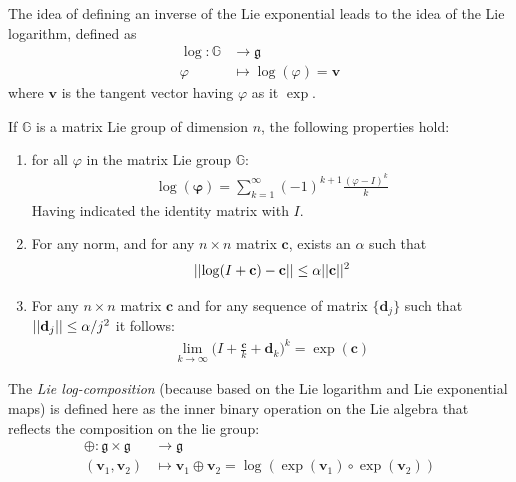 The idea of defining an inverse of the Lie exponential leads to the idea of the Lie logarithm, defined as
\begin{align*}
\log : \mathbb{G} & \longrightarrow \mathfrak{g} \\
\varphi &\longmapsto \log (\varphi)  =  \mathbf{v}   
\end{align*}
where $\mathbf{v}$ is the tangent vector having $\varphi$ as it $\exp$.

\noindent
If $\mathbb{G}$ is a matrix Lie group of dimension $n$, the following properties hold:
\begin{enumerate}
	\item for all $\varphi$ in the matrix Lie group $\mathbb{G}$:
	\begin{align}\label{eq:log_as_inf_sum}
	\log(\mathbf{\varphi}) = \sum_{k=1}^{\infty}(-1)^{k+1} \frac{(\varphi-I)^{k} }{k}
	\end{align}
	Having indicated the identity matrix with $I$.
	\item For any norm, and for any $n\times n$ matrix $\mathbf{c}$, exists an $\alpha$ such that 
	\begin{align}\label{eq:prop_matrix_diff_log}
	\vert\lvert  \log(I + \mathbf{c}) - \mathbf{c}  \rvert\vert  \leq \alpha \vert\lvert  \mathbf{c} \rvert\vert^{2}
	\end{align}
	\item For any $n\times n$ matrix $\mathbf{c}$ and for any sequence of matrix $\{\mathbf{d}_{j}\}$ such that  $\vert\lvert  \mathbf{d}_{j} \rvert\vert \leq \alpha/j^2$ it follows:
	\begin{align}\label{eq:prop_matrix_lim}
	\lim_{k\rightarrow \infty} \big( I + \frac{\mathbf{c}}{k} + \mathbf{d}_{k} \big)^{k} = \exp{(\mathbf{c})}
	\end{align}
\end{enumerate} 

The \emph{Lie log-composition} (because based on the Lie logarithm and Lie exponential maps) is defined here as the inner binary operation on the Lie algebra that reflects the composition on the lie group:
\begin{align*}
\oplus : \mathfrak{g} \times \mathfrak{g} & \longrightarrow \mathfrak{g}    \\
(\mathbf{v}_{1}, \mathbf{v}_{2}) &\longmapsto \mathbf{v}_{1}\oplus \mathbf{v}_{2} =  \log(\exp(\mathbf{v}_1)\circ \exp(\mathbf{v}_2))
\end{align*}

